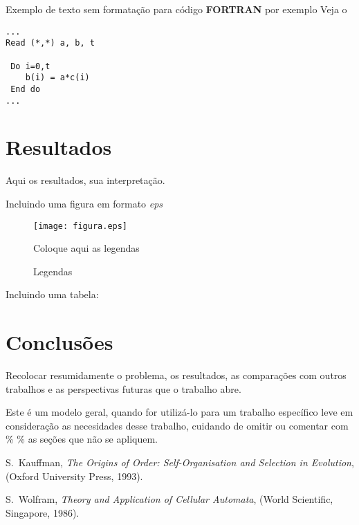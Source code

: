 \vspace{0.3cm}
Exemplo de texto sem formatação para código {\bf FORTRAN} por exemplo
Veja o %

\begin{verbatim}
...
Read (*,*) a, b, t

 Do i=0,t
    b(i) = a*c(i)
 End do
...

\end{verbatim}

\section{Resultados}
\vspace{2cm}
 Aqui os resultados, sua interpretação.

Incluindo uma figura em formato {\it eps}

\begin{figure}[hbtp]
\begin{center}
\texttt{[image: figura.eps]}
\caption{Coloque aqui as legendas}
\label{fig}
\end{center}
\end{figure}
\vspace{0.5cm}

\begin{figure}[htbp]
\begin{center}
\caption{Legendas}
\label{fig_rotacao}
\end{center}
\end{figure}



Incluindo uma tabela:

\section{Conclusões}
Recolocar resumidamente o problema, os resultados, as comparações \cite{Wolfram_book} com outros
trabalhos e as perspectivas futuras que o trabalho abre.

{\color{red} Este é um modelo geral, quando for utilizá-lo para um trabalho
específico leve em consideração as necesidades desse trabalho,
cuidando de omitir ou comentar com \% \% as seções que não
se apliquem.}

\begin{thebibliography}{99}

S.~Kauffman, {\em The Origins of Order: Self-Organisation and
Selection in Evolution}, (Oxford University Press, 1993).

S.~Wolfram, {\em Theory and Application of Cellular Automata},
(World Scientific, Singapore, 1986).

\end{thebibliography}



